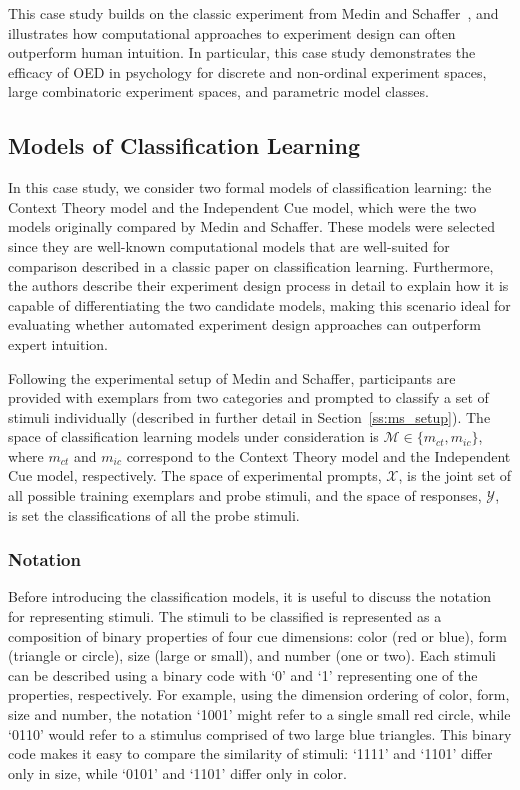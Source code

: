 \documentclass{article}
\begin{document}
 This case study builds on the classic experiment from Medin and Schaffer~\cite{medin78:pr}, and illustrates how computational approaches to experiment design can often outperform human intuition. In particular, this case study demonstrates the efficacy of OED in psychology for discrete and non-ordinal experiment spaces, large combinatoric experiment spaces, and parametric model classes. 

\subsection{Models of Classification Learning}

In this case study, we consider two formal models of classification learning: the Context Theory model and the Independent Cue model, which were the two models originally compared by Medin and Schaffer. These models were selected since they are well-known computational models that are well-suited for comparison described in a classic paper on classification learning. Furthermore, the authors describe their experiment design process in detail to explain how it is capable of differentiating the two candidate models, making this scenario ideal for evaluating whether automated experiment design approaches can outperform expert intuition. 

Following the experimental setup of Medin and Schaffer, participants are provided with exemplars from two categories and prompted to classify a set of stimuli individually (described in further detail in Section~\ref{ss:ms_setup}). The space of classification learning models under consideration is $\mathcal{M} \in \{m_{ct}, m_{ic}\}$, where $m_{ct}$ and $m_{ic}$ correspond to the Context Theory model and the Independent Cue model, respectively. The space of experimental prompts, $\mathcal{X}$, is the joint set of all possible training exemplars and probe stimuli, and the space of responses, $\mathcal{Y}$, is set the classifications of all the probe stimuli.

\subsubsection{Notation}

Before introducing the classification models, it is useful to discuss the notation for representing stimuli. The stimuli to be classified is represented as a composition of binary properties of four cue dimensions: color (red or blue), form (triangle or circle), size (large or small), and number (one or two). Each stimuli can be described using a binary code with `0' and `1' representing one of the properties, respectively. For example, using the dimension ordering of color, form, size and number, the notation `1001' might refer to a single small red circle, while `0110' would refer to a stimulus comprised of two large blue triangles. This binary code makes it easy to compare the similarity of stimuli: `1111' and `1101' differ only in size, while `0101' and `1101' differ only in color. 
\end{document}
